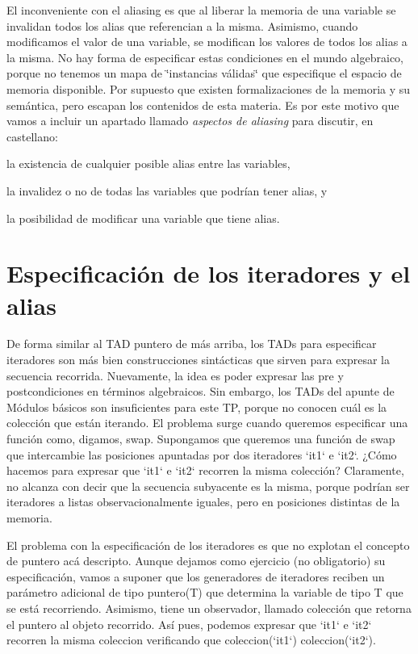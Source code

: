 \-El inconveniente con el aliasing es que al liberar la memoria de una variable se invalidan todos los alias que referencian a la misma. \-Asimismo, cuando modificamos el valor de una variable, se modifican los valores de todos los alias a la misma. \-No hay forma de especificar estas condiciones en el mundo algebraico, porque no tenemos un mapa de \char`\"{}instancias válidas\char`\"{} que especifique el espacio de memoria disponible. \-Por supuesto que existen formalizaciones de la memoria y su semántica, pero escapan los contenidos de esta materia. \-Es por este motivo que vamos a incluir un apartado llamado {\itshape aspectos de aliasing\/} para discutir, en castellano\-:
\begin{DoxyItemize}
\item la existencia de cualquier posible alias entre las variables,
\item la invalidez o no de todas las variables que podrían tener alias, y
\item la posibilidad de modificar una variable que tiene alias.
\end{DoxyItemize}\hypertarget{Aliasing_sec-iteradores}{}\section{\-Especificación de los iteradores y el alias}\label{Aliasing_sec-iteradores}
\-De forma similar al \-T\-A\-D puntero de más arriba, los \-T\-A\-Ds para especificar iteradores son más bien construcciones sintácticas que sirven para expresar la secuencia recorrida. \-Nuevamente, la idea es poder expresar las pre y postcondiciones en términos algebraicos. \-Sin embargo, los \-T\-A\-Ds del apunte de \-Módulos básicos son insuficientes para este \-T\-P, porque no conocen cuál es la colección que están iterando. \-El problema surge cuando queremos especificar una función como, digamos, swap. \-Supongamos que queremos una función de swap que intercambie las posiciones apuntadas por dos iteradores `it1` e `it2`. ¿\-Cómo hacemos para expresar que `it1` e `it2` recorren la misma colección? \-Claramente, no alcanza con decir que la secuencia subyacente es la misma, porque podrían ser iteradores a listas observacionalmente iguales, pero en posiciones distintas de la memoria.

\-El problema con la especificación de los iteradores es que no explotan el concepto de puntero acá descripto. \-Aunque dejamos como ejercicio (no obligatorio) su especificación, vamos a suponer que los generadores de iteradores reciben un parámetro adicional de tipo puntero(\-T) que determina la variable de tipo \-T que se está recorriendo. \-Asimismo, tiene un observador, llamado colección que retorna el puntero al objeto recorrido. \-Así pues, podemos expresar que `it1` e `it2` recorren la misma coleccion verificando que coleccion(`it1`)  coleccion(`it2`). 